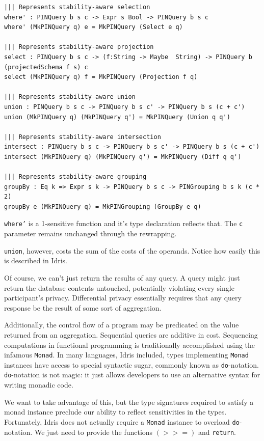 \documentclass[12pt]{article}
\begin{document}
\begin{lstlisting}[caption={Representing privacy-aware transformations},label={lst:transformations}]
||| Represents stability-aware selection
where' : PINQuery b s c -> Expr s Bool -> PINQuery b s c
where' (MkPINQuery q) e = MkPINQuery (Select e q)

||| Represents stability-aware projection
select : PINQuery b s c -> (f:String -> Maybe  String) -> PINQuery b (projectedSchema f s) c
select (MkPINQuery q) f = MkPINQuery (Projection f q)

||| Represents stability-aware union
union : PINQuery b s c -> PINQuery b s c' -> PINQuery b s (c + c')
union (MkPINQuery q) (MkPINQuery q') = MkPINQuery (Union q q')

||| Represents stability-aware intersection
intersect : PINQuery b s c -> PINQuery b s c' -> PINQuery b s (c + c')
intersect (MkPINQuery q) (MkPINQuery q') = MkPINQuery (Diff q q')

||| Represents stability-aware grouping
groupBy : Eq k => Expr s k -> PINQuery b s c -> PINGrouping b s k (c * 2)
groupBy e (MkPINQuery q) = MkPINGrouping (GroupBy e q)
\end{lstlisting}

\texttt{where'} is a 1-sensitive function and it's type declaration reflects that.
The \texttt{c} parameter remains unchanged through the rewrapping.

\texttt{union}, however, costs the sum of the costs of the operands.
Notice how easily this is described in Idris.

Of course, we can't just return the results of any query.
A query might just return the database contents untouched, potentially violating every single participant's privacy.
Differential privacy essentially requires that any query response be the result of some sort of aggregation.

Additionally, the control flow of a program may be predicated on the value returned from an aggregation.
Sequential queries are additive in cost.
Sequencing computations in functional programming is traditionally accomplished using the infamous \texttt{Monad}.
In many languages, Idris included, types implementing \texttt{Monad} instances have access to special syntactic sugar, commonly known as \texttt{do}-notation.
\texttt{do}-notation is not magic: it just allows developers to use an alternative syntax for writing monadic code.

We want to take advantage of this, but the type signatures required to satisfy a monad instance preclude our ability to reflect sensitivities in the types.
Fortunately, Idris does not actually require a \texttt{Monad} instance to overload \texttt{do}-notation.
We just need to provide the functions \texttt{$(>>=)$} and \texttt{return}.
\end{document}
